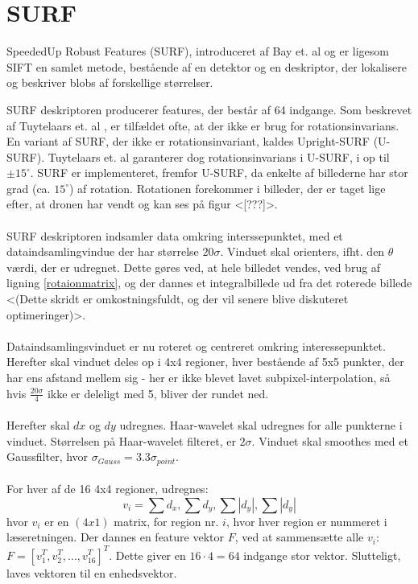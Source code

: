 \section{SURF}
SpeededUp Robust Features (SURF), introduceret af Bay et. al \cite{SURF} og er ligesom SIFT en samlet metode, bestående af en detektor og en deskriptor, der lokalisere og beskriver blobs af forskellige størrelser.


SURF deskriptoren producerer features, der består af 64 indgange. Som beskrevet af Tuytelaars et. al \cite{SURF}, er tilfældet ofte, at der ikke er brug for rotationsinvarians. En variant af SURF, der ikke er rotationsinvariant, kaldes Upright-SURF (U-SURF). Tuytelaars et. al garanterer dog rotationsinvarians i U-SURF, i op til $\pm 15^{\circ}$. SURF er implementeret, fremfor U-SURF, da enkelte af billederne har stor grad (ca. $15^{\circ}$) af rotation. Rotationen forekommer i billeder, der er taget lige efter, at dronen har vendt og kan ses på figur <[???]>.
\\
\\
SURF deskriptoren indsamler data omkring interssepunktet, med et dataindsamlingvindue der har størrelse $20 \sigma$. Vinduet skal orienters, ifht. den $\theta$ værdi, der er udregnet. Dette gøres ved, at hele billedet vendes, ved brug af ligning \eqref{rotaionmatrix}, og der dannes et integralbillede ud fra det roterede billede <(Dette skridt er omkostningsfuldt, og der vil senere blive diskuteret optimeringer)>.
\\
\\
Dataindsamlingsvinduet er nu roteret og centreret omkring interessepunktet. Herefter skal vinduet deles op i 4x4 regioner, hver bestående af 5x5 punkter, der har ens afstand mellem sig - her er ikke blevet lavet subpixel-interpolation, så hvis $\frac{20\sigma}{4}$ ikke er deleligt med 5, bliver der rundet ned.
\\
\\
Herefter skal $dx$ og $dy$ udregnes. Haar-wavelet skal udregnes for alle punkterne i vinduet. Størrelsen på Haar-wavelet filteret, er $2\sigma$. Vinduet skal smoothes med et Gaussfilter, hvor $\sigma_{Gauss} = 3.3\sigma_{point}$.
\\
\\
For hver af de 16 4x4 regioner, udregnes: 
\begin{equation}
v_i = \sum d_x, \sum d_y, \sum |d_y|, \sum |d_y|
\label{surffeature}
\end{equation}
hvor $v_i$ er en $(4x1)$ matrix, for region nr. $i$, hvor hver region er nummeret i læseretningen. Der dannes en feature vektor $F$, ved at sammensætte alle $v_i$: $F = [v_1^T, v_2^T,..., v_16^T]^T$. Dette giver en $16 \cdot 4 = 64$ indgange stor vektor. Slutteligt, laves vektoren til en enhedsvektor.
